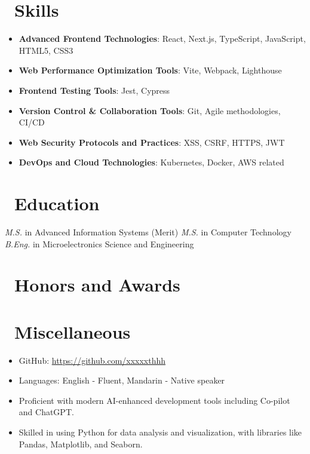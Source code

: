 \documentclass{resume}
\begin{document}
\section{\faCogs\ Skills}
\begin{itemize}[parsep=0.5ex]
  \item \textbf{Advanced Frontend Technologies}: React, Next.js, TypeScript, JavaScript, HTML5, CSS3
  \item \textbf{Web Performance Optimization Tools}: Vite, Webpack, Lighthouse
  \item \textbf{Frontend Testing Tools}: Jest, Cypress
  \item \textbf{Version Control \& Collaboration Tools}: Git, Agile methodologies, CI/CD
  \item \textbf{Web Security Protocols and Practices}: XSS, CSRF, HTTPS, JWT
  \item \textbf{DevOps and Cloud Technologies}: Kubernetes, Docker, AWS related 
\end{itemize}

\section{\faGraduationCap\ Education}
\textit{M.S.} in Advanced Information Systems (Merit)
\textit{M.S.} in Computer Technology \\
\textit{B.Eng.} in Microelectronics Science and Engineering

\section{\faHeartO\ Honors and Awards}

\section{\faInfo\ Miscellaneous}
\begin{itemize}[parsep=0.5ex]
  \item GitHub: \href{https://github.com/xxxxxthhh}{https://github.com/xxxxxthhh}
  \item Languages: English - Fluent, Mandarin - Native speaker
  \item Proficient with modern AI-enhanced development tools including Co-pilot and ChatGPT.
  \item Skilled in using Python for data analysis and visualization, with libraries like Pandas, Matplotlib, and Seaborn.
\end{itemize}
\end{document}
